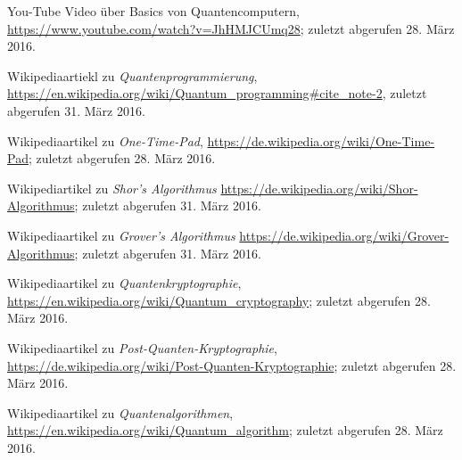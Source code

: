 \documentclass[letterpaper, 12pt]{article}
\begin{document}
\begin{thebibliography}{9}
    
    You-Tube Video über Basics von Quantencomputern,
    \url{https://www.youtube.com/watch?v=JhHMJCUmq28};
    zuletzt abgerufen 28. März 2016.

    Wikipediaartiekl zu \emph{Quantenprogrammierung},
    \url{https://en.wikipedia.org/wiki/Quantum_programming#cite_note-2},
    zuletzt abgerufen 31. März 2016.

    Wikipediaartikel zu \emph{One-Time-Pad},
    \url{https://de.wikipedia.org/wiki/One-Time-Pad};
    zuletzt abgerufen 28. März 2016.
    
    Wikipediartikel zu \emph{Shor's Algorithmus}
    \url{https://de.wikipedia.org/wiki/Shor-Algorithmus};
    zuletzt abgerufen 31. März 2016.
    
    Wikipediaartikel zu \emph{Grover's Algorithmus}
    \url{https://de.wikipedia.org/wiki/Grover-Algorithmus};
    zuletzt abgerufen 31. März 2016.

    Wikipediaartikel zu \emph{Quantenkryptographie},
    \url{https://en.wikipedia.org/wiki/Quantum_cryptography};
    zuletzt abgerufen 28. März 2016.
    
    Wikipediaartikel zu \emph{Post-Quanten-Kryptographie},
    \url{https://de.wikipedia.org/wiki/Post-Quanten-Kryptographie};
    zuletzt abgerufen 28. März 2016.
    
    Wikipediaartikel zu \emph{Quantenalgorithmen},
    \url{https://en.wikipedia.org/wiki/Quantum_algorithm};
    zuletzt abgerufen 28. März 2016.

\end{thebibliography}

\newpage

\listoffigures
\listoftables
\end{document}
